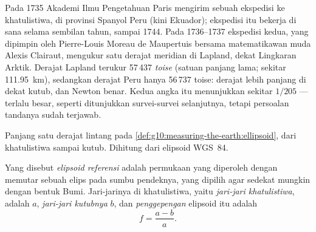 \begin{history}
Pada 1735 Akademi Ilmu Pengetahuan Paris mengirim sebuah ekspedisi ke
khatulistiwa, di provinsi Spanyol Peru (kini Ekuador); ekspedisi itu bekerja
di sana selama sembilan tahun, sampai 1744. Pada 1736--1737 ekspedisi kedua, yang
dipimpin oleh Pierre-Louis Moreau de Maupertuis bersama matematikawan muda Alexis
Clairaut, mengukur satu derajat meridian di Lapland, dekat Lingkaran Arktik.
Derajat Lapland terukur 57\,437 \emph{toise} (satuan panjang lama; sekitar
\qty{111.95}{km}), sedangkan derajat Peru hanya 56\,737 toise: derajat lebih
panjang di dekat kutub, dan Newton benar. Kedua angka itu menunjukkan
 sekitar $1/205$ --- terlalu besar, seperti ditunjukkan
survei-survei selanjutnya, tetapi persoalan tandanya sudah terjawab.
\end{history}

\begin{omfigure}

{\small Panjang satu derajat lintang pada 
\cref{def:g10:measuring-the-earth:ellipsoid}, dari khatulistiwa sampai
kutub. Dihitung dari elipsoid WGS~84.}
\end{omfigure}

\begin{definition}\label{def:g10:measuring-the-earth:ellipsoid}
Yang disebut \emph{elipsoid referensi} adalah
permukaan yang diperoleh dengan memutar sebuah elips pada sumbu pendeknya,
yang dipilih agar sedekat mungkin dengan bentuk Bumi. Jari-jarinya di
khatulistiwa, yaitu \emph{jari-jari khatulistiwa}, adalah $a$, \emph{jari-jari
kutubnya} $b$, dan \emph{penggepengan} elipsoid itu adalah
\[
  f = \frac{a-b}{a}.
\]
\end{definition}


